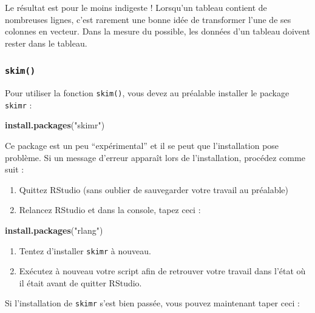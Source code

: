 \documentclass[
  a4paper,
]{article}
\newenvironment{Shaded}{\begin{snugshade}}{\end{snugshade}}
\newcommand{\KeywordTok}[1]{\textcolor[rgb]{0.12,0.11,0.11}{\textbf{#1}}}
\newcommand{\NormalTok}[1]{\textcolor[rgb]{0.12,0.11,0.11}{#1}}
\newcommand{\StringTok}[1]{\textcolor[rgb]{0.75,0.01,0.01}{#1}}
\providecommand{\tightlist}{%
  \setlength{\itemsep}{0pt}\setlength{\parskip}{0pt}}
\begin{document}
Le résultat est pour le moins indigeste ! Lorsqu'un tableau contient de nombreuses lignes, c'est rarement une bonne idée de transformer l'une de ses colonnes en vecteur. Dans la mesure du possible, les données d'un tableau doivent rester dans le tableau.

\hypertarget{skim}{%
\subsubsection{\texorpdfstring{\texttt{skim()}}{skim()}}\label{skim}}

Pour utiliser la fonction \texttt{skim()}, vous devez au préalable installer le package \texttt{skimr} :

\begin{Shaded}
\begin{Highlighting}[]
\KeywordTok{install.packages}\NormalTok{(}\StringTok{"skimr"}\NormalTok{)}
\end{Highlighting}
\end{Shaded}

Ce package est un peu ``expérimental'' et il se peut que l'installation pose problème. Si un message d'erreur apparaît lors de l'installation, procédez comme suit :

\begin{enumerate}
\def\labelenumi{\arabic{enumi}.}
\tightlist
\item
  Quittez RStudio (sans oublier de sauvegarder votre travail au préalable)
\item
  Relancez RStudio et dans la console, tapez ceci :
\end{enumerate}

\begin{Shaded}
\begin{Highlighting}[]
\KeywordTok{install.packages}\NormalTok{(}\StringTok{"rlang"}\NormalTok{)}
\end{Highlighting}
\end{Shaded}

\begin{enumerate}
\def\labelenumi{\arabic{enumi}.}
\setcounter{enumi}{2}
\tightlist
\item
  Tentez d'installer \texttt{skimr} à nouveau.
\item
  Exécutez à nouveau votre script afin de retrouver votre travail dans l'état où il était avant de quitter RStudio.
\end{enumerate}

Si l'installation de \texttt{skimr} s'est bien passée, vous pouvez maintenant taper ceci :
\end{document}
